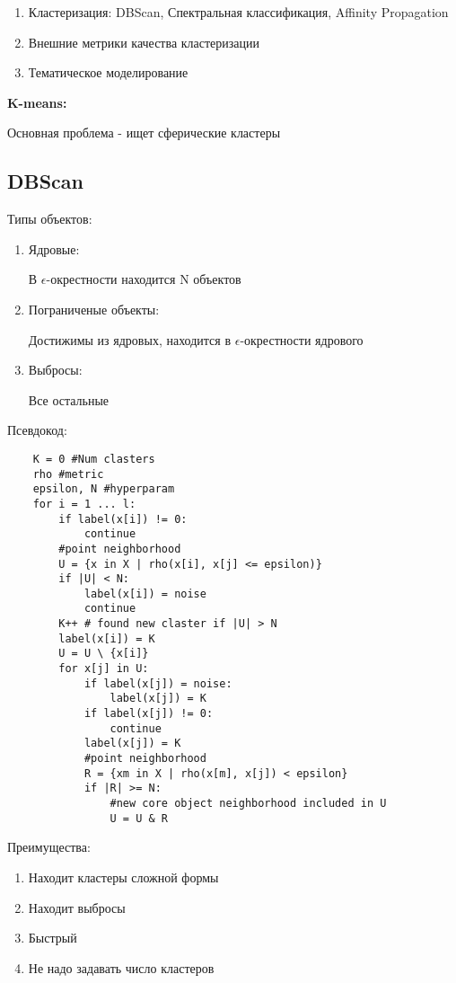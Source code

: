 \documentclass[a4paper, 12pt]{article}
\begin{document}
\begin{enumerate}
    \item Кластеризация: DBScan, 
    Спектральная классификация,
    Affinity Propagation
    \item Внешние метрики качества кластеризации
    \item Тематическое моделирование
\end{enumerate}

\textbf{K-means:}

Основная проблема - ищет сферические кластеры

\subsection{DBScan}

Типы объектов:

\begin{enumerate}
    \item Ядровые:
    
    В $\epsilon$-окрестности находится N объектов

    \item Пограниченые объекты:
    
    Достижимы из ядровых, находится в 
    $\epsilon$-окрестности ядрового

    \item Выбросы:
    
    Все остальные
\end{enumerate}

Псевдокод:

\begin{lstlisting}
    K = 0 #Num clasters
    rho #metric
    epsilon, N #hyperparam
    for i = 1 ... l:
        if label(x[i]) != 0:
            continue
        #point neighborhood
        U = {x in X | rho(x[i], x[j] <= epsilon)}
        if |U| < N:
            label(x[i]) = noise
            continue
        K++ # found new claster if |U| > N
        label(x[i]) = K
        U = U \ {x[i]}
        for x[j] in U:
            if label(x[j]) = noise:
                label(x[j]) = K
            if label(x[j]) != 0:
                continue
            label(x[j]) = K
            #point neighborhood
            R = {xm in X | rho(x[m], x[j]) < epsilon}
            if |R| >= N:
                #new core object neighborhood included in U
                U = U & R
\end{lstlisting}

Преимущества:

\begin{enumerate}
    \item Находит кластеры сложной формы
    \item Находит выбросы
    \item Быстрый
    \item Не надо задавать число кластеров
\end{enumerate}
    
\end{document}
